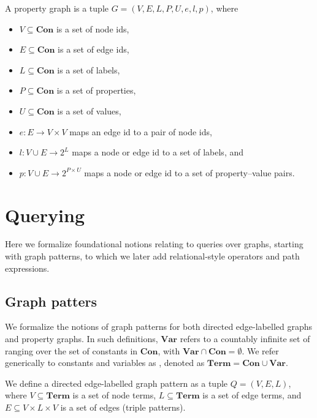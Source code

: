 \begin{definition}\label{def:property-graph}
    A property graph is a tuple $G = (V, E, L, P, U, e, l, p)$, where
    \begin{itemize}
        \item $V \subseteq \textbf{Con}$ is a set of node ids,
        \item $E \subseteq \textbf{Con}$ is a set of edge ids,
        \item $L \subseteq \textbf{Con}$ is a set of labels,
        \item $P \subseteq \textbf{Con}$ is a set of properties,
        \item $U \subseteq \textbf{Con}$ is a set of values,
        \item $e : E \to V \times V$ maps an edge id to a pair of node ids,
        \item $l : V \cup E \to 2^L$ maps a node or edge id to a set of labels, and
        \item $p : V \cup E \to 2^{P \times U}$ maps a node or edge id to a set of property–value pairs.
    \end{itemize}
    \end{definition}

\section{Querying}
Here we formalize foundational notions relating to queries over graphs, starting with graph patterns, to which we later add relational-style operators and path expressions.

\subsection{Graph patters}
We formalize the notions of graph patterns for both directed edge-labelled graphs and property graphs. In such definitions, $\textbf{Var}$ refers to a countably infinite set of  ranging over the set of constants in $\textbf{Con}$, with $\textbf{Var}\cap\textbf{Con}=\emptyset$. We refer generically to constants and variables as , denoted as $\textbf{Term} = \textbf{Con} \cup \textbf{Var}$. 

\begin{definition}\label{def:directed-edge-labelled-graph-pattern}
    We define a directed edge-labelled graph pattern as a tuple $Q = (V, E, L)$, where $V \subseteq \textbf{Term}$ is a set of node terms, $L \subseteq \textbf{Term}$ is a set of edge terms, and $E \subseteq V \times L \times V$ is a set of edges (triple patterns).
\end{definition}


